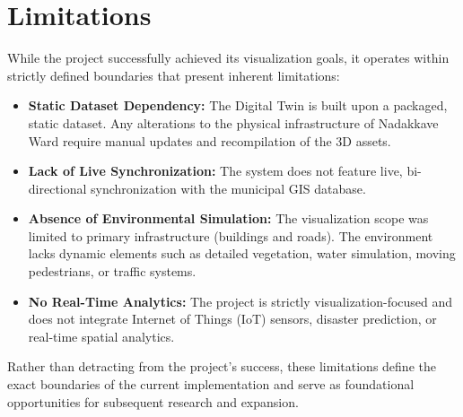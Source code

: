 \section{Limitations}
While the project successfully achieved its visualization goals, it operates within strictly defined boundaries that present inherent limitations:
\begin{itemize}
    \item \textbf{Static Dataset Dependency:} The Digital Twin is built upon a packaged, static dataset. Any alterations to the physical infrastructure of Nadakkave Ward require manual updates and recompilation of the 3D assets.
    \item \textbf{Lack of Live Synchronization:} The system does not feature live, bi-directional synchronization with the municipal GIS database. 
    \item \textbf{Absence of Environmental Simulation:} The visualization scope was limited to primary infrastructure (buildings and roads). The environment lacks dynamic elements such as detailed vegetation, water simulation, moving pedestrians, or traffic systems.
    \item \textbf{No Real-Time Analytics:} The project is strictly visualization-focused and does not integrate Internet of Things (IoT) sensors, disaster prediction, or real-time spatial analytics.
\end{itemize}
Rather than detracting from the project's success, these limitations define the exact boundaries of the current implementation and serve as foundational opportunities for subsequent research and expansion.

